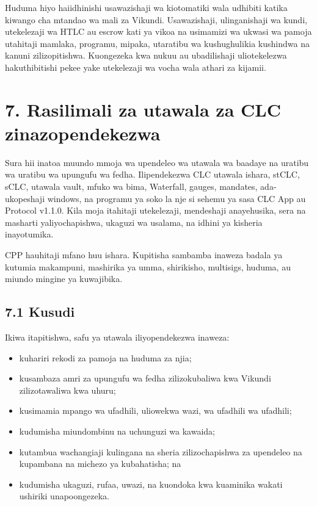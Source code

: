 \documentclass[11pt]{article}
\begin{document}
Huduma hiyo haiidhinishi usawazishaji wa kiotomatiki wala udhibiti katika kiwango cha mtandao wa mali za Vikundi. Usawazishaji, ulinganishaji wa kundi, utekelezaji wa HTLC au escrow kati ya vikoa na usimamizi wa ukwasi wa pamoja utahitaji mamlaka, programu, mipaka, utaratibu wa kushughulikia kushindwa na kanuni zilizopitishwa. Kuongezeka kwa nukuu au ubadilishaji uliotekelezwa hakuthibitishi pekee yake utekelezaji wa vocha wala athari za kijamii.


\section*{7. Rasilimali za utawala za CLC zinazopendekezwa}

Sura hii inatoa muundo mmoja wa upendeleo wa utawala wa baadaye na uratibu wa uratibu wa upungufu wa fedha. Ilipendekezwa CLC utawala ishara, stCLC, sCLC, utawala vault, mfuko wa bima, Waterfall, gauges, mandates, ada-ukopeshaji windows, na programu ya soko la nje si sehemu ya sasa CLC App au Protocol v1.1.0. Kila moja itahitaji utekelezaji, mendeshaji anayehusika, sera na masharti yaliyochapishwa, ukaguzi wa usalama, na idhini ya kisheria inayotumika.

CPP hauhitaji mfano huu ishara. Kupitisha sambamba inaweza badala ya kutumia makampuni, mashirika ya umma, shirikisho, multisigs, huduma, au miundo mingine ya kuwajibika.

\subsection*{7.1 Kusudi}

Ikiwa itapitishwa, safu ya utawala iliyopendekezwa inaweza:

\begin{itemize}[leftmargin=*]
\item kuhariri rekodi za pamoja na huduma za njia;
\item kusambaza amri za upungufu wa fedha zilizokubaliwa kwa Vikundi zilizotawaliwa kwa uhuru;
\item kusimamia mpango wa ufadhili, uliowekwa wazi, wa ufadhili wa ufadhili;
\item kudumisha miundombinu na uchunguzi wa kawaida;
\item kutambua wachangiaji kulingana na sheria zilizochapishwa za upendeleo na kupambana na michezo ya kubahatisha; na
\item kudumisha ukaguzi, rufaa, uwazi, na kuondoka kwa kuaminika wakati ushiriki unapoongezeka.
\end{itemize}
\end{document}
